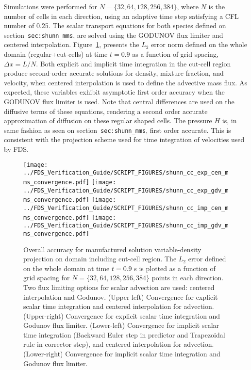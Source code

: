 \documentclass[12pt]{article}
\begin{document}


Simulations were performed for $N = \{32, 64, 128, 256, 384\}$, where $N$ is the number of cells in each direction, using an adaptive time step satisfying a CFL number of 0.25. The scalar transport equations for both species defined on section~\texttt{sec:shunn\_mms}, are solved using the GODUNOV flux limiter and centered interpolation. Figure~\ref{fig:shunn_cc_accuracy_order}, presents the $L_2$ error norm defined on the whole domain (regular+cut-cells) at time $t = 0.9$ as a function of grid spacing, $\Delta x = L/N$. Both explicit and implicit time integration in the cut-cell region produce second-order accurate solutions for density, mixture fraction, and velocity, when centered interpolation is used to define the advective mass flux. As expected, these variables exhibit asymptotic first order accuracy when the GODUNOV flux limiter is used. Note that central differences are used on the diffusive terms of these equations, rendering a second order accurate approximation of diffusion on these regular shaped cells. The pressure $H$ is, in same fashion as seen on section~\texttt{sec:shunn\_mms}, first order accurate. This is consistent with the projection scheme used for time integration of velocities used by FDS.


\begin{figure}[ht]
\centering
\texttt{[image: ../FDS\_Verification\_Guide/SCRIPT\_FIGURES/shunn\_cc\_exp\_cen\_mms\_convergence.pdf]}
\texttt{[image: ../FDS\_Verification\_Guide/SCRIPT\_FIGURES/shunn\_cc\_exp\_gdv\_mms\_convergence.pdf]}
\texttt{[image: ../FDS\_Verification\_Guide/SCRIPT\_FIGURES/shunn\_cc\_imp\_cen\_mms\_convergence.pdf]}
\texttt{[image: ../FDS\_Verification\_Guide/SCRIPT\_FIGURES/shunn\_cc\_imp\_gdv\_mms\_convergence.pdf]}
\caption[The {\ct Shunn CC} accuracy order test case]{Overall accuracy for manufactured solution variable-density projection on domain including cut-cell region. The $L_2$ error defined on the whole domain at time $t = 0.9$ s is plotted as a function of grid spacing for $N=\{32,64,128,256,384\}$ points in each direction. Two flux limiting options for scalar advection are used: centered interpolation and Godunov.  (Upper-left) Convergence for explicit scalar time integration and centered interpolation for advection.  (Upper-right) Convergence for explicit scalar time integration and Godunov flux limiter.  (Lower-left) Convergence for implicit scalar time integration (Backward Euler step in predictor and Trapezoidal rule in corrector step), and  centered interpolation for advection. (Lower-right) Convergence for implicit scalar time integration and Godunov flux limiter.  }\label{fig:shunn_cc_accuracy_order}
\end{figure}
\end{document}
